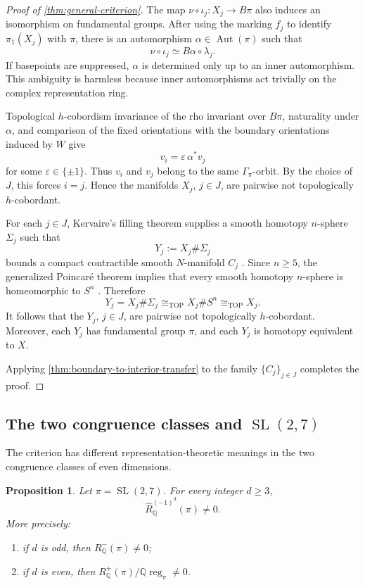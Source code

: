 \documentclass[10pt,reqno]{amsart}
\numberwithin{equation}{section}
\newtheorem{proposition}{Proposition}
\theoremstyle{definition}
\theoremstyle{remark}
\newcommand{\Q}{\mathbb Q}
\newcommand{\TOP}{\mathrm{TOP}}
\newcommand{\Aut}{\operatorname{Aut}}
\newcommand{\SL}{\operatorname{SL}}
\begin{document}
\begin{proof}[Proof of \cref{thm:general-criterion}]
The map \(\nu\circ\iota_j\colon X_j\to B\pi\) also induces an
isomorphism on fundamental groups.  After using the marking \(f_j\)
to identify \(\pi_1(X_j)\) with \(\pi\), there is an automorphism
\(\alpha\in\Aut(\pi)\) such that
\[
\nu\circ\iota_j
\simeq
B\alpha\circ\lambda_j.
\]
If basepoints are suppressed, \(\alpha\) is determined only up to an
inner automorphism.  This ambiguity is harmless because inner
automorphisms act trivially on the complex representation ring.

Topological \(h\)-cobordism invariance of the rho invariant over
\(B\pi\), naturality under \(\alpha\), and comparison of the fixed
orientations with the boundary orientations induced by \(W\) give
\[
v_i
=
\varepsilon\,\alpha^*v_j
\]
for some \(\varepsilon\in\{\pm1\}\).  Thus \(v_i\) and \(v_j\) belong
to the same \(\Gamma_\pi\)-orbit.  By the choice of \(J\), this forces
\(i=j\).  Hence the manifolds \(X_j\), \(j\in J\), are pairwise not
topologically \(h\)-cobordant.

For each \(j\in J\), Kervaire's filling theorem supplies a smooth
homotopy \(n\)-sphere \(\Sigma_j\) such that
\[
Y_j:=X_j\#\Sigma_j
\]
bounds a compact contractible smooth \(N\)-manifold \(C_j\)
\cite[Theorem~3]{KervaireHomologySpheres}.  Since \(n\geq5\), the
generalized Poincar\'e theorem implies that every smooth homotopy
\(n\)-sphere is homeomorphic to \(S^n\)
\cite{SmalePoincare}.  Therefore
\[
Y_j
=
X_j\#\Sigma_j
\cong_{\TOP}
X_j\#S^n
\cong_{\TOP}
X_j.
\]
It follows that the \(Y_j\), \(j\in J\), are pairwise not
topologically \(h\)-cobordant.  Moreover, each \(Y_j\) has fundamental
group \(\pi\), and each \(Y_j\) is homotopy equivalent to \(X\).

Applying \cref{thm:boundary-to-interior-transfer} to the family
\(\{C_j\}_{j\in J}\) completes the proof.
\end{proof}

\subsection{The two congruence classes and
\texorpdfstring{\(\SL(2,7)\)}{SL(2,7)}}

The criterion has different representation-theoretic meanings in the
two congruence classes of even dimensions.

\begin{proposition}\label{prop:sl27-all-even}
Let \(\pi=\SL(2,7)\).  For every integer \(d\geq3\),
\[
\widehat R^{(-1)^d}_{\Q}(\pi)\neq0.
\]
More precisely:
\begin{enumerate}[label=\textup{(\roman*)}]
\item if \(d\) is odd, then \(R^-_{\Q}(\pi)\neq0\);
\item if \(d\) is even, then
      \(R^+_{\Q}(\pi)/\Q\operatorname{reg}_\pi\neq0\).
\end{enumerate}
\end{proposition}
\end{document}
